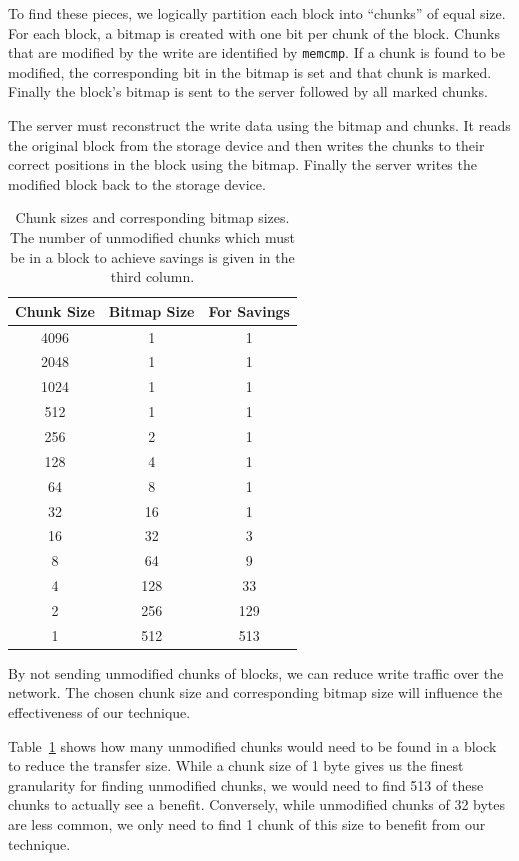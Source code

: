 \documentclass[10pt,twocolumn]{article}
\begin{document}
To find these pieces, we logically partition each block into ``chunks'' of equal
size. %
For each block, a bitmap is created with one bit per chunk of the block. %
Chunks that are modified by the write are identified by \texttt{memcmp}. %
If a chunk is found to be modified, the corresponding bit in the bitmap is set 
and that chunk is marked. %
Finally the block's bitmap is sent to the server followed by all marked chunks. %

The server must reconstruct the write data using the bitmap and chunks. %
It reads the original block from the storage device and then writes the chunks 
to their correct positions in the block using the bitmap. %
Finally the server writes the modified block back to the storage device. %

\begin{table} [htbp]
  \centering
  \begin{tabular}{|c|c||c|}
    \hline
    Chunk Size & Bitmap Size & For Savings \\ \hline
    4096 & 1   & 1   \\ \hline
    2048 & 1   & 1   \\ \hline
    1024 & 1   & 1   \\ \hline
    512  & 1   & 1   \\ \hline
    256  & 2   & 1   \\ \hline
    128  & 4   & 1   \\ \hline
    64   & 8   & 1   \\ \hline
    32   & 16  & 1   \\ \hline
    16   & 32  & 3   \\ \hline
    8    & 64  & 9   \\ \hline
    4    & 128 & 33  \\ \hline
    2    & 256 & 129 \\ \hline
    1    & 512 & 513 \\ \hline
  \end{tabular}
  \caption{Chunk sizes and corresponding bitmap sizes. The number of unmodified
    chunks which must be in a block to achieve savings is given in the third
    column.}
  \label{tab:chunksforsavings}
\end{table}

By not sending unmodified chunks of blocks, we can reduce write traffic over the
network. %
The chosen chunk size and corresponding bitmap size will influence the
effectiveness of our technique. %

Table~\ref{tab:chunksforsavings} shows how many unmodified chunks would need to be
found in a block to reduce the transfer size. %
While a chunk size of 1 byte gives us the finest granularity for finding
unmodified chunks, we would need to find 513 of these chunks to actually see a
benefit. %
Conversely, while unmodified chunks of 32 bytes are less common, we only need to
find 1 chunk of this size to benefit from our technique. %
\end{document}
